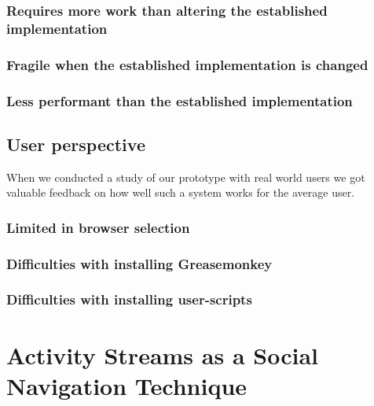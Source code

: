\subsubsection{Requires more work than altering the established
  implementation}

\subsubsection{Fragile when the established implementation is changed}

\subsubsection{Less performant than the established implementation}

\subsection{User perspective}

When we conducted a study of our prototype with real world users
we got valuable feedback on how well such a system works for the average user.

\subsubsection{Limited in browser selection}

\subsubsection{Difficulties with installing Greasemonkey}

\subsubsection{Difficulties with installing user-scripts}


\section{Activity Streams as a Social Navigation Technique}

